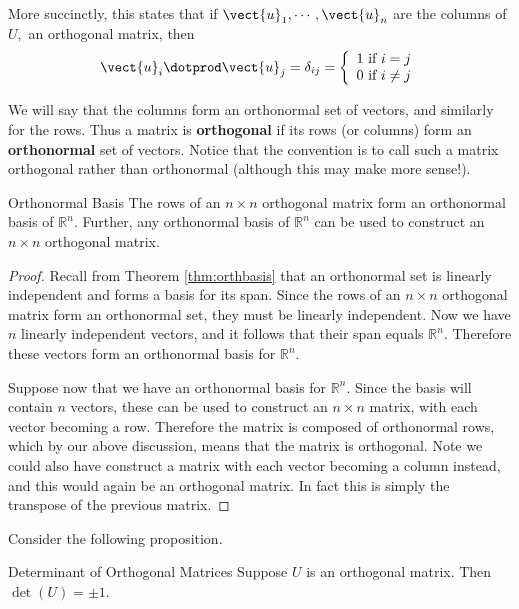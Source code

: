 More succinctly, this states that if $\vect{u}_{1},\cdots ,\vect{u}_{n}$
are the columns of $U,$ an orthogonal matrix, then 
\[
\vect{u}_{i}\dotprod \vect{u}_{j}=\delta _{ij} = \left\{ 
\begin{array}{c}
1\text{ if }i=j \\ 
0\text{ if }i\neq j
\end{array}
\right.  
\]

We will say that the columns form an orthonormal set of vectors, and similarly for the rows. Thus a matrix is \textbf{orthogonal} if its rows (or columns) form an
\textbf{orthonormal} set of vectors. Notice that the convention is to call such a matrix orthogonal rather than orthonormal (although this may make more sense!). 

\begin{proposition}{Orthonormal Basis}\label{prop:orthbasis}
The rows of an $n \times n$ orthogonal matrix form an orthonormal
basis of $\mathbb{R}^n$. Further, any orthonormal basis of
$\mathbb{R}^n$ can be used to construct an $n \times n$ orthogonal
matrix.
\end{proposition}

\begin{proof}
Recall from Theorem \ref{thm:orthbasis} that an orthonormal set is
linearly independent and forms a basis for its span. Since the rows of
an $n \times n$ orthogonal matrix form an orthonormal set, they must
be linearly independent. Now we have $n$ linearly independent vectors,
and it follows that their span equals $\mathbb{R}^n$. Therefore these
vectors form an orthonormal basis for $\mathbb{R}^n$.

Suppose now that we have an orthonormal basis for $\mathbb{R}^n$. Since the
basis will contain $n$ vectors, these can be used to construct an $n
\times n$ matrix, with each vector becoming a row. Therefore the
matrix is composed of orthonormal rows, which by our above discussion,
means that the matrix is orthogonal. Note we could also have construct
a matrix with each vector becoming a column instead, and this would
again be an orthogonal matrix. In fact this is simply the transpose of
the previous matrix.
\end{proof}

Consider the following proposition.

\begin{proposition}{Determinant of Orthogonal Matrices}\label{prop:orthoDet}
Suppose $U$ is an orthogonal matrix. Then $\det \left( U\right) = \pm 1.$ 
\end{proposition}

